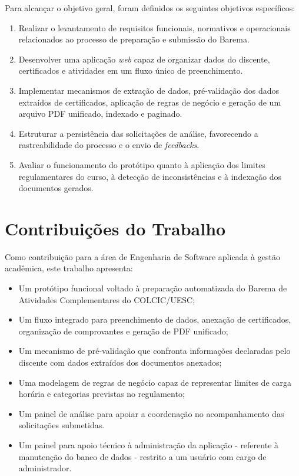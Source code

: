 Para alcançar o objetivo geral, foram definidos os seguintes objetivos específicos:
\begin{enumerate}
    \item Realizar o levantamento de requisitos funcionais, normativos e operacionais relacionados ao processo de preparação e submissão do Barema.
    \item Desenvolver uma aplicação \textit{web} capaz de organizar dados do discente, certificados e atividades em um fluxo único de preenchimento.
    \item Implementar mecanismos de extração de dados, pré-validação dos dados extraídos de certificados, aplicação de regras de negócio e geração de um arquivo PDF unificado, indexado e paginado.
    \item Estruturar a persistência das solicitações de análise, favorecendo a rastreabilidade do processo e o envio de \textit{feedbacks}.
    \item Avaliar o funcionamento do protótipo quanto à aplicação dos limites regulamentares do curso, à detecção de inconsistências e à indexação dos documentos gerados.
\end{enumerate}

\section{Contribuições do Trabalho}

Como contribuição para a área de Engenharia de Software aplicada à gestão acadêmica, este trabalho apresenta:

\begin{itemize}
    \item Um protótipo funcional voltado à preparação automatizada do Barema de Atividades Complementares do COLCIC/UESC;
    \item Um fluxo integrado para preenchimento de dados, anexação de certificados, organização de comprovantes e geração de PDF unificado;
    \item Um mecanismo de pré-validação que confronta informações declaradas pelo discente com dados extraídos dos documentos anexados;
    \item Uma modelagem de regras de negócio capaz de representar limites de carga horária e categorias previstas no regulamento;
    \item Um painel de análise para apoiar a coordenação no acompanhamento das solicitações submetidas.
    \item Um painel para apoio técnico à administração da aplicação - referente à manutenção do banco de dados - restrito a um usuário com cargo de administrador.
\end{itemize}

